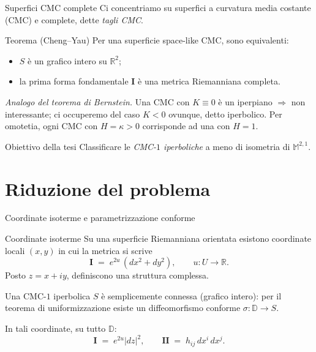 \documentclass[aspectratio=169,11pt]{beamer}
\newcommand{\R}{\mathbb{R}}
\newcommand{\D}{\mathbb{D}}
\newcommand{\M}{\mathbb{M}^{2,1}}
\newcommand{\Iff}{\mathbf{I}}
\newcommand{\IIff}{\mathbf{II}}
\begin{document}
\begin{frame}[t]{Superfici CMC complete}
  Ci concentriamo su superfici \alert{a curvatura media costante}
  (CMC) e \alert{complete}, dette \emph{tagli CMC}.

  \vspace{2mm}
  \begin{block}{Teorema (Cheng--Yau)}
    Per una superficie space-like CMC, sono equivalenti:
    \begin{itemize}\itemsep=0pt
      \item $S$ è un grafico intero su $\R^2$;
      \item la prima forma fondamentale $\Iff$ è una metrica
            Riemanniana \alert{completa}.
    \end{itemize}
  \end{block}

  \vspace{2mm}
  \emph{Analogo del teorema di Bernstein.}\;
  Una CMC con $K\equiv 0$ è un iperpiano $\Rightarrow$ non interessante;
  ci occuperemo del caso $K<0$ ovunque, detto \alert{iperbolico}.
  Per omotetia, ogni CMC con $H=\kappa>0$ corrisponde ad una con $H=1$.

  \vspace{3mm}
  \begin{alertblock}{Obiettivo della tesi}
    \centering
    Classificare le \emph{CMC-$1$ iperboliche} a meno di isometria di $\M$.
  \end{alertblock}
\end{frame}


\section{Riduzione del problema}

\begin{frame}[t]{Coordinate isoterme e parametrizzazione conforme}
  \begin{block}{Coordinate isoterme}
    Su una superficie Riemanniana orientata esistono coordinate locali
    $(x,y)$ in cui la metrica si scrive
    \[
      \Iff \;=\; e^{2u}\,(dx^2+dy^2),
      \qquad u:U\to\R.
    \]
    Posto $z=x+iy$, definiscono una struttura complessa.
  \end{block}

  \vspace{1mm}
  Una CMC-$1$ iperbolica $S$ è semplicemente connessa (grafico intero):
  per il \alert{teorema di uniformizzazione} esiste un diffeomorfismo
  conforme $\sigma:\D\to S$.

  \vspace{1mm}
  In tali coordinate, su tutto $\D$:
  \[
    \Iff \;=\; e^{2u}|dz|^2,
    \qquad
    \IIff \;=\; h_{ij}\,dx^i\,dx^j.
  \]
\end{frame}
\end{document}
